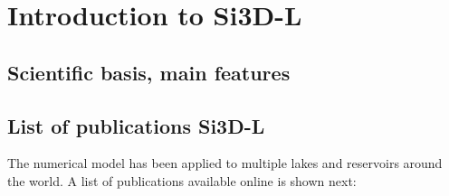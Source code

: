 \chapter{Introduction to Si3D-L}
\section{Scientific basis, main features}




\section{List of publications Si3D-L}

The numerical model has been applied to multiple lakes and reservoirs around the world. A list of publications available online is shown next:  

